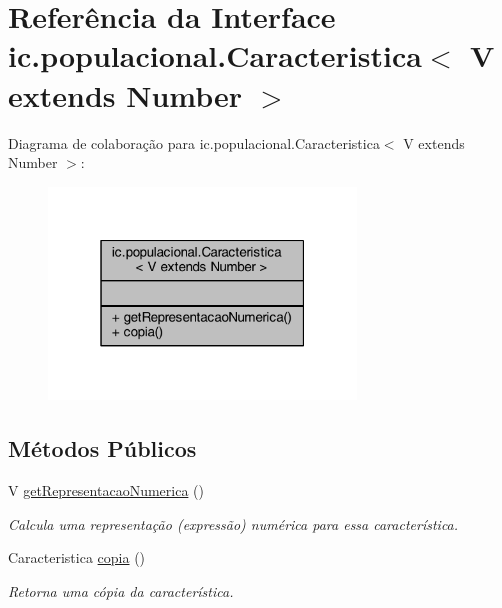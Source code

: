 \hypertarget{interfaceic_1_1populacional_1_1_caracteristica_3_01_v_01extends_01_number_01_4}{\section{Referência da Interface ic.\-populacional.\-Caracteristica$<$ V extends Number $>$}
\label{interfaceic_1_1populacional_1_1_caracteristica_3_01_v_01extends_01_number_01_4}
}


Diagrama de colaboração para ic.\-populacional.\-Caracteristica$<$ V extends Number $>$\-:
\nopagebreak
\begin{figure}[H]
\begin{center}
\leavevmode
\includegraphics[width=232pt]{interfaceic_1_1populacional_1_1_caracteristica_3_01_v_01extends_01_number_01_4__coll__graph}
\end{center}
\end{figure}
\subsection*{Métodos Públicos}
\begin{DoxyCompactItemize}
\item 
V \hyperlink{interfaceic_1_1populacional_1_1_caracteristica_3_01_v_01extends_01_number_01_4_a974c1c992b4b916c8b92217f2a381ff6}{get\-Representacao\-Numerica} ()
\begin{DoxyCompactList}\small\item\em Calcula uma representação (expressão) numérica para essa característica. \end{DoxyCompactList}\item 
Caracteristica \hyperlink{interfaceic_1_1populacional_1_1_caracteristica_3_01_v_01extends_01_number_01_4_a5c687979e881636769c487450193599b}{copia} ()
\begin{DoxyCompactList}\small\item\em Retorna uma cópia da característica. \end{DoxyCompactList}\end{DoxyCompactItemize}


